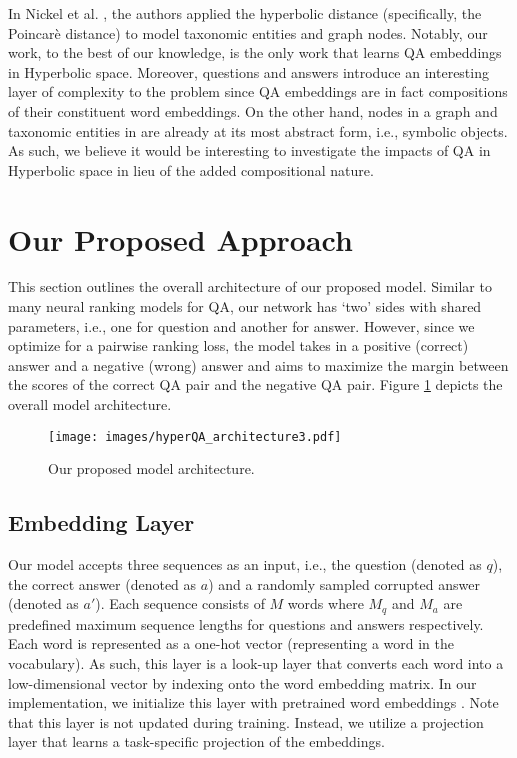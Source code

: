 \documentclass[sigconf]{acmart}
\begin{document}
In Nickel et al. \cite{DBLP:journals/corr/NickelK17}, the authors applied the hyperbolic distance (specifically, the Poincar\`e distance) to model taxonomic entities and graph nodes. Notably, our work, to the best of our knowledge, is the only work that learns QA embeddings in Hyperbolic space. Moreover, questions and answers introduce an interesting layer of complexity to the problem since QA embeddings are in fact compositions of their constituent word embeddings. On the other hand, nodes in a graph and taxonomic entities in \cite{DBLP:journals/corr/NickelK17} are already at its most abstract form, i.e., symbolic objects. As such, we believe it would be interesting to investigate the impacts of QA in Hyperbolic space in lieu of the added compositional nature. 


\section{Our Proposed Approach}
This section outlines the overall architecture of our proposed model. Similar to many neural ranking models for QA, our network has `two' sides with shared parameters, i.e., one for question and another for answer. However, since we optimize for a pairwise ranking loss, the model takes in a positive (correct) answer and a negative (wrong) answer and aims to maximize the margin between the scores of the correct QA pair and the negative QA pair. Figure \ref{overall} depicts the overall model architecture. 
\begin{figure}[ht]
\begin{center}
\texttt{[image: images/hyperQA\_architecture3.pdf]}
\caption{Our proposed model architecture.}
\label{overall}
\end{center}
\end{figure}
\vspace{-1em}

\subsection{Embedding Layer}
Our model accepts three sequences as an input, i.e., the question (denoted as $q$), the correct answer (denoted as $a$) and a randomly sampled corrupted answer (denoted as $a'$). Each sequence consists of $M$ words where $M_{q}$ and $M_{a}$ are predefined maximum sequence lengths for questions and answers respectively. Each word is represented as a one-hot vector (representing a word in the vocabulary). As such, this layer is a look-up layer that converts each word into a low-dimensional vector by indexing onto the word embedding matrix. In our implementation, we initialize this layer with pretrained word embeddings \cite{DBLP:conf/emnlp/PenningtonSM14}. Note that this layer is not updated during training. Instead, we utilize a projection layer that learns a task-specific projection of the embeddings. 
\end{document}
